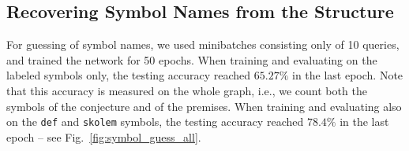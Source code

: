 \documentclass{ecai}
\begin{document}
\subsection{Recovering Symbol Names from the Structure}
For guessing of symbol names, we used minibatches consisting only of
10 queries, and trained the network for 50 epochs. When training and
evaluating on the labeled symbols only, the testing accuracy reached
$65.27\%$ in the last epoch. Note that this accuracy is measured on
the whole graph, i.e., we count both the symbols of the conjecture and of the
premises. When training and evaluating also on the
\texttt{def} and \texttt{skolem} symbols, the testing accuracy reached
$78.4\%$ in the last epoch -- see Fig.~\ref{fig:symbol_guess_all}.


\end{document}
